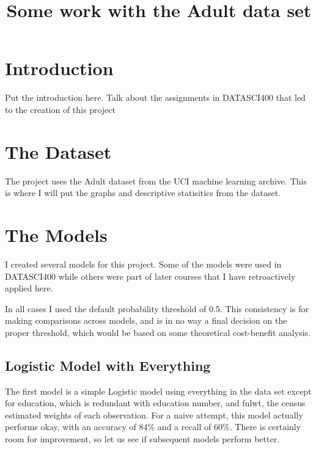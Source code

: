 \documentclass{article}
\title{Some work with the Adult data set}
\begin{document}
\section{Introduction}

Put the introduction here. Talk about the assignments in DATASCI400 that led to the creation of this project

\section{The Dataset}

The project uses the Adult dataset from the UCI machine learning archive.  This is where I will put the graphs and descriptive statisitics from the dataset.

\section{The Models}

I created several models for this project.  Some of the models were used in DATASCI400 while others were part of later courses that I have retroactively applied here.

In all cases I used the default probability threshold of 0.5.  This consistency is for making comparisons across models, and is in no way a final decision on the proper threshold, which would be based on some theoretical cost-benefit analysis.

\subsection{Logistic Model with Everything}

The first model is a simple Logistic model using everything in the data set except for education, which is redundant with education number, and fnlwt, the census estimated weights of each observation.  For a naive attempt, this model actually performs okay, with an accuracy of 84\% and a recall of 60\%.  There is certainly room for improvement, so let us see if subsequent models perform better.
\end{document}
